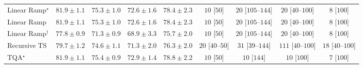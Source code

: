 \begin{tabular}{l|cccc|cccc|}
Linear Ramp$^\star$ & {\cellcolor[HTML]{004629}} \color[HTML]{F1F1F1} $81.9\pm 1.1$ & {\cellcolor[HTML]{51B365}} \color[HTML]{F1F1F1} $75.3\pm 1.0$ & {\cellcolor[HTML]{9AD587}} \color[HTML]{000000} $72.6\pm 1.6$ & {\cellcolor[HTML]{1A7D40}} \color[HTML]{F1F1F1} $78.4\pm 2.3$ & {\cellcolor[HTML]{FFF7F3}} \color[HTML]{000000} $10$ [$50$] & {\cellcolor[HTML]{FFF4F0}} \color[HTML]{000000} $20$ [$105$--$144$] & {\cellcolor[HTML]{FFF4F0}} \color[HTML]{000000} $20$ [$40$--$100$] & {\cellcolor[HTML]{FFF7F3}} \color[HTML]{000000} $8$ [$100$] \\
Linear Ramp & {\cellcolor[HTML]{004629}} \color[HTML]{F1F1F1} $81.9\pm 1.1$ & {\cellcolor[HTML]{51B365}} \color[HTML]{F1F1F1} $75.3\pm 1.0$ & {\cellcolor[HTML]{9AD587}} \color[HTML]{000000} $72.6\pm 1.6$ & {\cellcolor[HTML]{1A7D40}} \color[HTML]{F1F1F1} $78.4\pm 2.3$ & {\cellcolor[HTML]{FFF7F3}} \color[HTML]{000000} $10$ [$50$] & {\cellcolor[HTML]{FFF4F0}} \color[HTML]{000000} $20$ [$105$--$144$] & {\cellcolor[HTML]{FFF4F0}} \color[HTML]{000000} $20$ [$40$--$100$] & {\cellcolor[HTML]{FFF7F3}} \color[HTML]{000000} $8$ [$100$] \\
Linear Ramp$^\dagger$ & {\cellcolor[HTML]{258745}} \color[HTML]{F1F1F1} $77.8\pm 0.9$ & {\cellcolor[HTML]{BAE394}} \color[HTML]{000000} $71.3\pm 0.9$ & {\cellcolor[HTML]{E8F6AE}} \color[HTML]{000000} $68.9\pm 3.3$ & {\cellcolor[HTML]{47AE60}} \color[HTML]{F1F1F1} $75.7\pm 2.0$ & {\cellcolor[HTML]{FFF7F3}} \color[HTML]{000000} $10$ [$50$] & {\cellcolor[HTML]{FFF4F0}} \color[HTML]{000000} $20$ [$105$--$144$] & {\cellcolor[HTML]{FFF4F0}} \color[HTML]{000000} $20$ [$40$--$100$] & {\cellcolor[HTML]{FFF7F3}} \color[HTML]{000000} $8$ [$100$] \\
Recursive TS & {\cellcolor[HTML]{056C39}} \color[HTML]{F1F1F1} $79.7\pm 1.2$ & {\cellcolor[HTML]{64BC6F}} \color[HTML]{F1F1F1} $74.6\pm 1.1$ & {\cellcolor[HTML]{BAE394}} \color[HTML]{000000} $71.3\pm 2.0$ & {\cellcolor[HTML]{3CA458}} \color[HTML]{F1F1F1} $76.3\pm 2.0$ & {\cellcolor[HTML]{FFF4F0}} \color[HTML]{000000} $20$ [$40$--$50$] & {\cellcolor[HTML]{FFF2EE}} \color[HTML]{000000} $31$ [$39$--$144$] & {\cellcolor[HTML]{FDE0DD}} \color[HTML]{000000} $111$ [$40$--$100$] & {\cellcolor[HTML]{FFF5F1}} \color[HTML]{000000} $18$ [$40$--$100$] \\
TQA$^\star$ & {\cellcolor[HTML]{004629}} \color[HTML]{F1F1F1} $81.9\pm 1.1$ & {\cellcolor[HTML]{4FB264}} \color[HTML]{F1F1F1} $75.4\pm 0.9$ & {\cellcolor[HTML]{92D183}} \color[HTML]{000000} $72.9\pm 1.4$ & {\cellcolor[HTML]{14783E}} \color[HTML]{F1F1F1} $78.8\pm 2.2$ & {\cellcolor[HTML]{FFF7F3}} \color[HTML]{000000} $10$ [$50$] & {\cellcolor[HTML]{FFF7F3}} \color[HTML]{000000} $10$ [$144$] & {\cellcolor[HTML]{FFF7F3}} \color[HTML]{000000} $10$ [$100$] & {\cellcolor[HTML]{FFF7F3}} \color[HTML]{000000} $7$ [$100$] \\

\end{tabular}
